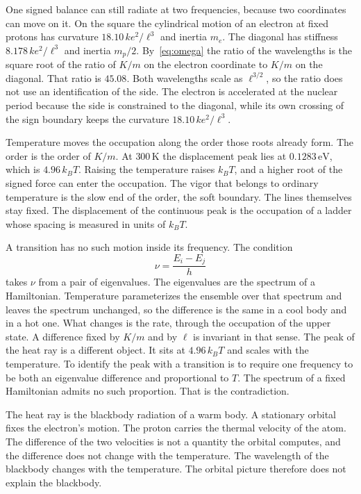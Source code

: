 \documentclass[a4paper]{article}
\begin{document}
One signed balance can still radiate at two frequencies, because two coordinates can move on it. On the square the cylindrical motion of an electron at fixed protons has curvature \(18.10\,k e^{2}/\ell^{3}\) and inertia \(m_e\). The diagonal has stiffness \(8.178\,k e^{2}/\ell^{3}\) and inertia \(m_p/2\). By~\eqref{eq:omega} the ratio of the wavelengths is the square root of the ratio of \(K/m\) on the electron coordinate to \(K/m\) on the diagonal. That ratio is \(45.08\). Both wavelengths scale as \(\ell^{3/2}\), so the ratio does not use an identification of the side. The electron is accelerated at the nuclear period because the side is constrained to the diagonal, while its own crossing of the sign boundary keeps the curvature \(18.10\,k e^{2}/\ell^{3}\).

Temperature moves the occupation along the order those roots already form. The order is the order of \(K/m\). At \(300\,\mathrm{K}\) the displacement peak lies at \(0.1283\,\mathrm{eV}\), which is \(4.96\,k_B T\). Raising the temperature raises \(k_B T\), and a higher root of the signed force can enter the occupation. The vigor that belongs to ordinary temperature is the slow end of the order, the soft boundary. The lines themselves stay fixed. The displacement of the continuous peak is the occupation of a ladder whose spacing is measured in units of \(k_B T\).

A transition has no such motion inside its frequency. The condition
\begin{equation}
\label{eq:bohrnu}
\nu=\frac{E_i-E_j}{h}
\end{equation}
takes \(\nu\) from a pair of eigenvalues. The eigenvalues are the spectrum of a Hamiltonian. Temperature parameterizes the ensemble over that spectrum and leaves the spectrum unchanged, so the difference is the same in a cool body and in a hot one. What changes is the rate, through the occupation of the upper state. A difference fixed by \(K/m\) and by \(\ell\) is invariant in that sense. The peak of the heat ray is a different object. It sits at \(4.96\,k_B T\) and scales with the temperature. To identify the peak with a transition is to require one frequency to be both an eigenvalue difference and proportional to \(T\). The spectrum of a fixed Hamiltonian admits no such proportion. That is the contradiction.

The heat ray is the blackbody radiation of a warm body. A stationary orbital fixes the electron's motion. The proton carries the thermal velocity of the atom. The difference of the two velocities is not a quantity the orbital computes, and the difference does not change with the temperature. The wavelength of the blackbody changes with the temperature. The orbital picture therefore does not explain the blackbody.
\end{document}
